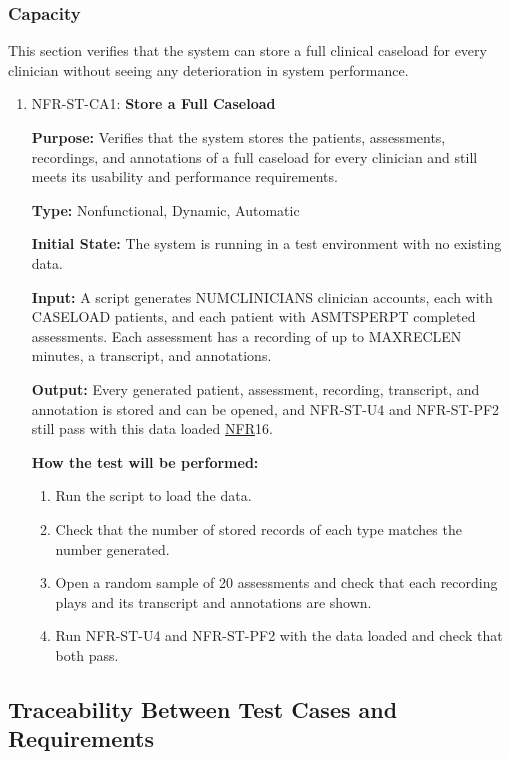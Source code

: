 \documentclass[12pt, titlepage]{article}
\newcommand{\srsnfr}[1]{\href{https://github.com/Nour-Fawaz/MacaBoca/blob/main/pdfs/SRS/SRS.pdf}{NFR}}
\renewcommand{\_}{\oldunderscore\allowbreak}
\begin{document}
\subsubsection{Capacity}
This section verifies that the system can store a full clinical caseload for every clinician without seeing any deterioration in system performance.
\begin{enumerate}
  \item NFR-ST-CA1: \textbf{Store a Full Caseload\\}
  \begin{mdframed}[linewidth=0.5mm]
      \textbf{Purpose:} Verifies that the system stores the patients, assessments, recordings, and annotations of a full caseload for every clinician and still meets its usability and performance requirements. \par
      \textbf{Type:} Nonfunctional, Dynamic, Automatic \par
      \textbf{Initial State:} The system is running in a test environment with no existing data. \par
      \textbf{Input:} A script generates NUM\_CLINICIANS clinician accounts, each with CASELOAD patients, and each patient with ASMTS\_PER\_PT completed assessments. Each assessment has a recording of up to MAX\_REC\_LEN minutes, a transcript, and annotations. \par
      \textbf{Output:} Every generated patient, assessment, recording, transcript, and annotation is stored and can be opened, and NFR-ST-U4 and NFR-ST-PF2 still pass with this data loaded \srsnfr*{16}. \par
      \textbf{How the test will be performed:}
      \begin{enumerate}
        \item[1.] Run the script to load the data.
        \item[2.] Check that the number of stored records of each type matches the number generated.
        \item[3.] Open a random sample of 20 assessments and check that each recording plays and its transcript and annotations are shown.
        \item[4.] Run NFR-ST-U4 and NFR-ST-PF2 with the data loaded and check that both pass.
      \end{enumerate}
  \end{mdframed}
\end{enumerate}

\subsection{Traceability Between Test Cases and Requirements} \label{sec:Traceability}
\end{document}
